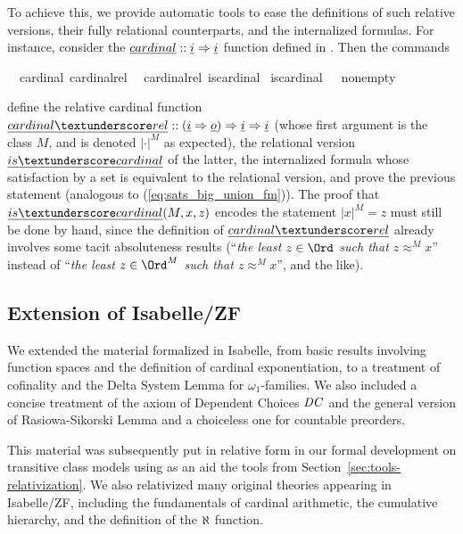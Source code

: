 To achieve this, we provide automatic tools to ease the definitions of
such relative versions, their fully relational counterparts, and the
internalized formulas. For instance, consider the
$\isa{cardinal}::\tyi \fun \tyi$ function defined in
. Then the commands
\begin{isabelle}
  \isamarkupfalse%
  \ \ {\isachardoublequoteopen}cardinal{\isachardoublequoteclose}\ {\isachardoublequoteopen}cardinal{\isacharunderscore}{\kern0pt}rel{\isachardoublequoteclose}\ \isanewline
  \isamarkupfalse%
  \ {\isachardoublequoteopen}cardinal{\isacharunderscore}{\kern0pt}rel{\isachardoublequoteclose}\ {\isachardoublequoteopen}is{\isacharunderscore}{\kern0pt}cardinal{\isachardoublequoteclose}\isanewline
  \isamarkupfalse%
  \ {\isachardoublequoteopen}is{\isacharunderscore}{\kern0pt}cardinal{\isachardoublequoteclose}\ \ \ {\isachardoublequoteopen}nonempty{\isachardoublequoteclose}%
\end{isabelle}
define the relative cardinal function
$\isa{cardinal{\uscore}rel}::(\tyi \fun \tyo) \fun \tyi \fun\tyi$
(whose first argument is the class $M$, and is denoted $|\cdot|^M$ as expected),
the relational version $\isa{is{\uscore}cardinal}$ of the latter, the
internalized formula  whose
satisfaction by a set is equivalent to the relational version, and
prove the previous statement (analogous to (\ref{eq:sats_big_union_fm})).
The proof that $\isa{is{\uscore}cardinal}(M,x,z)$  encodes the
statement $|x|^M = z$ must still be done by hand, since the definition
of $\isa{cardinal{\uscore}rel}$ already involves some tacit
absoluteness results (“\textit{the least $z \in \Ord$ such that $z
  \approx^M x$}” instead
of “\textit{the least $z \in \Ord^M$ such that $z
  \approx^M x$}”, and the like).

\subsection{Extension of Isabelle/ZF}
\label{sec:extension-isabellezf}
We extended \cite{Delta_System_Lemma-AFP} the material formalized in
Isabelle, from basic results involving function spaces and the
definition of cardinal exponentiation, to a treatment of cofinality
and the Delta System Lemma for $\omega_1$-families. We also included a
concise treatment of the axiom of Dependent Choices $\mathit{DC}$ and the
general version of Rasiowa-Sikorski Lemma \cite{2018arXiv180705174G}
and a choiceless one for countable preorders.

This material was subsequently put in relative form in our formal
development on transitive class models \cite{Transitive_Models-AFP}
using as an aid the tools from
Section~\ref{sec:tools-relativization}. We also relativized many
original theories appearing in Isabelle/ZF, including the
fundamentals of cardinal arithmetic, the cumulative hierarchy, and the
definition of the $\aleph_{}$ function.


